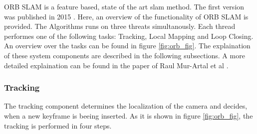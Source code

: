 	ORB SLAM is a feature based, state of the art slam method. The first version was published in 2015 \cite{orb}. 
	Here, an overview of the functionality of ORB SLAM is provided. The Algorithms runs on three threats simultanously.
	Each thread performes one of the following tasks: Tracking, Local Mapping and Loop Closing. An overview over the tasks can be found 
	in figure \ref{fig:orb_fig}. The explaination of these system components are described in the following subsections. 
	A more detailed explaination can be found in the paper of Raul Mur-Artal et al \cite{orb}.
	
	
	\subsubsection{Tracking}
	
	The tracking component determines the localization of the camera and decides, when a new keyframe is beeing inserted.
	As it is shown in figure \ref{fig:orb_fig}, the tracking is performed in four steps.
	
